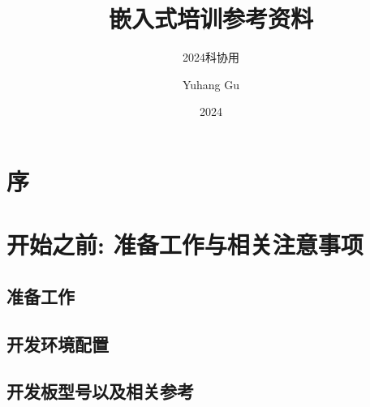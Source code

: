 \documentclass[cn,newtx,15pt]{elegantbook}
\title{嵌入式培训参考资料}
\subtitle{2024科协用}
\author{Yuhang Gu}
\date{2024}
\institute{Southeast University, School of Electronics Engineering}
\begin{document}
\maketitle

\frontmatter
\tableofcontents
\newpage

\chapter{序}



\mainmatter

\chapter{开始之前: 准备工作与相关注意事项}

\section{准备工作}
\section{开发环境配置}
\section{开发板型号以及相关参考}
\end{document}
